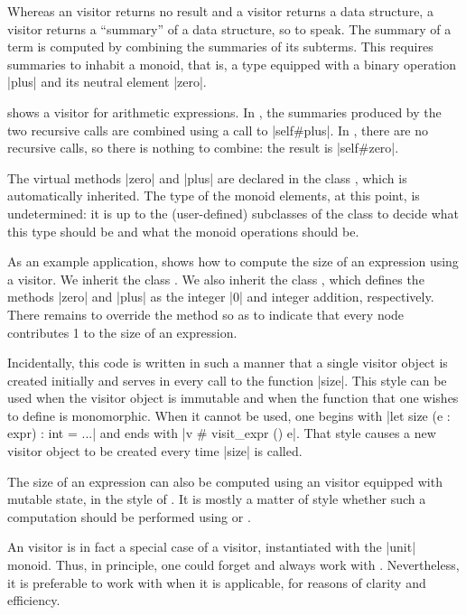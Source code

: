 \documentclass[11pt,a4paper,twoside]{article}
\begin{document}
Whereas an \iter visitor returns no result and a \map visitor returns a data
structure, a \reduce visitor returns a ``summary'' of a data structure, so to
speak. The summary of a term is computed by combining the summaries of its
subterms. This requires summaries to inhabit a monoid, that is, a type
equipped with a binary operation \oc|plus| and its neutral element \oc|zero|.

 shows a \reduce visitor for arithmetic expressions. In
, the summaries produced by the two recursive calls are
combined using a call to \oc|self#plus|. In , there are
no recursive calls, so there is nothing to combine: the result is
\oc|self#zero|.

The virtual methods \oc|zero| and \oc|plus| are declared in the class
, which is automatically inherited. The type of the
monoid elements, at this point, is undetermined: it is up to the
(user-defined) subclasses of the class \reduce to decide what this type should
be and what the monoid operations should be.

As an example application,  shows how to compute the size of
an expression using a \reduce visitor. We inherit the class \reduce. We also
inherit the class , which defines the
methods \oc|zero| and \oc|plus| as the integer \oc|0| and integer addition,
respectively. There remains to override the method  so as
to indicate that every node contributes 1 to the size of an expression.

Incidentally, this code is written in such a manner that a single visitor
object is created initially and serves in every call to the function
\oc|size|. This style can be used when the visitor object is immutable and
when the function that one wishes to define is monomorphic. When it cannot be
used, one begins with \oc|let size (e : expr) : int = ...| and ends with %
\oc|v # visit_expr () e|. That style causes a new visitor object to be created
every time \oc|size| is called.

The size of an expression can also be computed using an \iter visitor equipped
with mutable state, in the style of . It is mostly a matter
of style whether such a computation should be performed using \iter or
\reduce.

An \iter visitor is in fact a special case of a \reduce visitor, instantiated
with the \oc|unit| monoid. Thus, in principle, one could forget \iter and
always work with \reduce. Nevertheless, it is preferable to work with \iter
when it is applicable, for reasons of clarity and efficiency.
\end{document}
